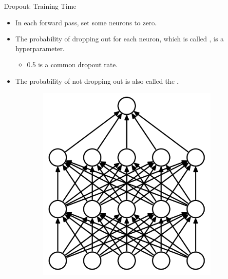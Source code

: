 \begin{frame}{Dropout: Training Time}
	\begin{itemize}
		\item In each forward pass,  set some neurons to zero.
		\medskip
		\item The probability of dropping out for each neuron, which is called , is a hyperparameter.
		\begin{itemize}
			\item 0.5 is a common dropout rate.
		\end{itemize}
		\medskip
		\item The probability of not dropping out is also called the .
	\end{itemize}
	\begin{figure}[H]
		\centering
		\begin{subfigure}[b]{0.45\textwidth}
			\centering
			\includegraphics[height=0.4\textheight]{Figs/Dropout-before.png}
		\end{subfigure}
		\begin{subfigure}[b]{0.45\textwidth}
			\centering

\end{subfigure}
\end{figure}
\end{frame}
